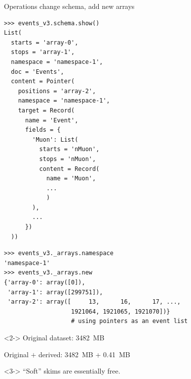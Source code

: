 \documentclass[aspectratio=169]{beamer}
\begin{document}
\begin{frame}[fragile]{Operations change schema, add new arrays}
\vspace{0.15 cm}
\scriptsize
\begin{verbatim}
>>> events_v3.schema.show()
List(
  starts = 'array-0',
  stops = 'array-1',
  namespace = 'namespace-1',
  doc = 'Events',
  content = Pointer(
    positions = 'array-2',
    namespace = 'namespace-1',
    target = Record(
      name = 'Event',
      fields = {
        'Muon': List(
          starts = 'nMuon',
          stops = 'nMuon',
          content = Record(
            name = 'Muon',
            ...
            )
        ),
        ...
      })
  ))
\end{verbatim}
\vspace{-7.7 cm}
\hfill \begin{minipage}{0.6\linewidth}
\begin{verbatim}
>>> events_v3._arrays.namespace
'namespace-1'
>>> events_v3._arrays.new
{'array-0': array([0]),
 'array-1': array([299751]),
 'array-2': array([     13,      16,      17, ...,
                   1921064, 1921065, 1921070])}
                   # using pointers as an event list
\end{verbatim}

\begin{uncoverenv}<2->
\normalsize
Original dataset: 3482~MB

\vspace{0.2 cm}
Original $+$ derived: 3482~MB + 0.41~MB
\end{uncoverenv}

\vspace{1 cm}
\begin{uncoverenv}<3->
\Large ``Soft'' skims are essentially free.
\end{uncoverenv}
\end{minipage}
\vspace{7.7 cm}
\end{frame}
\end{document}
